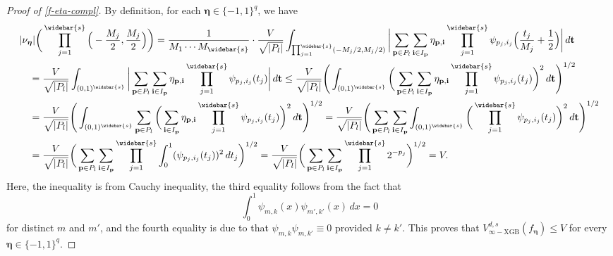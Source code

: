 \documentclass[10pt]{article}
\newcommand{\vinfxgb}{{V^{d, s}_{\infty-\text{XGB}}}}
\newcommand{\pbf}{{\mathbf{p}}}
\newcommand{\ibf}{{\mathbf{i}}}
\newcommand{\tbf}{{\mathbf{t}}}
\newcommand{\etabf}{{\boldsymbol{\eta}}}
\begin{document}
\begin{proof}[Proof of \eqref{f-eta-compl}]
By definition, for each $\etabf \in \{-1, 1\}^q$, we have
\begin{equation*}
\begin{aligned}
    &|\nu_{\etabf}|\bigg(\prod_{j = 1}^{\widebar{s}} 
    \Big(-\frac{M_j}{2}, \frac{M_j}{2}\Big)\bigg)
    = \frac{1}{M_1 \cdots M_{\widebar{s}}} 
    \cdot \frac{V}{\sqrt{|P_l|}} 
    \int_{\prod_{j = 1}^{\widebar{s}} (-M_j/2, M_j/2)} 
    \bigg|\sum_{\pbf \in P_l} 
    \sum_{\ibf \in I_{\pbf}} 
    \eta_{\pbf, \ibf} \prod_{j = 1}^{\widebar{s}} 
    \psi_{p_j, i_j} \Big(\frac{t_j}{M_j} 
    + \frac{1}{2}\Big) \bigg| \, d\tbf \\
    &\quad= \frac{V}{\sqrt{|P_l|}} 
    \int_{(0, 1)^{\widebar{s}}} \bigg| 
    \sum_{\pbf \in P_l} 
    \sum_{\ibf \in I_{\pbf}} 
    \eta_{\pbf, \ibf} 
    \prod_{j = 1}^{\widebar{s}} \psi_{p_j, i_j}(t_j) \bigg| \, d\tbf 
    \le \frac{V}{\sqrt{|P_l|}} \Bigg(\int_{(0, 1)^{\widebar{s}}} 
    \bigg(\sum_{\pbf \in P_l} 
    \sum_{\ibf \in I_{\pbf}} \eta_{\pbf, \ibf} 
    \prod_{j = 1}^{\widebar{s}} \psi_{p_j, i_j}(t_j) \bigg)^2 
    \, d\tbf \Bigg)^{1/2} \\
    &\quad= \frac{V}{\sqrt{|P_l|}} \Bigg(\int_{(0, 1)^{\widebar{s}}} 
    \sum_{\pbf \in P_l} \bigg(\sum_{\ibf \in I_{\pbf}} 
    \eta_{\pbf, \ibf} \prod_{j = 1}^{\widebar{s}} 
    \psi_{p_j, i_j}(t_j) \bigg)^2 \, d\tbf \Bigg)^{1/2} 
    = \frac{V}{\sqrt{|P_l|}} \Bigg(\sum_{\pbf \in P_l} 
    \sum_{\ibf \in I_{\pbf}} 
    \int_{(0, 1)^{\widebar{s}}} \bigg(\prod_{j = 1}^{\widebar{s}} 
    \psi_{p_j, i_j}(t_j)\bigg)^2 \, d\tbf \Bigg)^{1/2} \\
    &\quad= \frac{V}{\sqrt{|P_l|}} \bigg(\sum_{\pbf \in P_l} 
    \sum_{\ibf \in I_{\pbf}} 
    \prod_{j = 1}^{\widebar{s}} 
    \int_{0}^{1} (\psi_{p_j, i_j}(t_j))^2 \, dt_j \bigg)^{1/2} 
    = \frac{V}{\sqrt{|P_l|}} \bigg(\sum_{\pbf \in P_l} 
    \sum_{\ibf \in I_{\pbf}} 
    \prod_{j = 1}^{\widebar{s}} 2^{-p_j} \bigg)^{1/2} = V.
\end{aligned}
\end{equation*}
Here, the inequality is from Cauchy inequality, the third equality 
follows from the fact that 
\begin{equation*}
    \int_{0}^{1} \psi_{m,k}(x) \psi_{m', k'}(x) \, dx = 0
\end{equation*}
for distinct $m$ and $m'$, and the fourth equality is due to that 
$\psi_{m,k} \psi_{m, k'} \equiv 0$ provided $k \neq k'$. This proves that 
$\vinfxgb(f_{\etabf}) \le V$ for every $\etabf \in \{-1, 1\}^q$. 
\end{proof}
\end{document}
